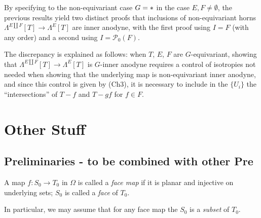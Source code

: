 \documentclass[a4paper,10pt,draft]{article}%
\begin{document}
\begin{remark}\label{TWOPROOF REM}
	By specifying to the non-equivariant case $G = \**$
	in the case $E,F \neq \emptyset$,
	the previous results yield two distinct proofs
	that inclusions of non-equivariant horns
	$\Lambda^{E \amalg F}[T] \to \Lambda^{E}[T]$
	are inner anodyne,
	with the first proof using $I=F$ (with any order) and a second using 
	$I = \mathcal{P}_0(F)$. 
		
	The discrepancy is explained as follows: 
	when $T$, $E$, $F$ are $G$-equivariant, showing that
	$\Lambda^{E \amalg F}[T] \to \Lambda^{E}[T]$ 
	is $G$-inner anodyne requires a control of isotropies 
	not needed when showing that the underlying map is non-equivariant inner anodyne, and since this control is given by (Ch3), it is necessary to include in the $\{U_i\}$ the
	``intersections'' of $T-f$ and $T-gf$ for $f\in F$. 
\end{remark}
















\newpage


\section{Other Stuff}

\subsection{Preliminaries - to be combined with other Pre}







\begin{definition}
      A map $f: S_0 \to T_0$ in $\Omega$ is called a \textit{face map} if it is planar and injective on underlying sets;
      $S_0$ is called a \textit{face} of $T_0$.
\end{definition}

\begin{remark}
      In particular, we may assume that for any face map  the $S_0$ is a \textit{subset} of $T_0$.
\end{remark}
\end{document}
